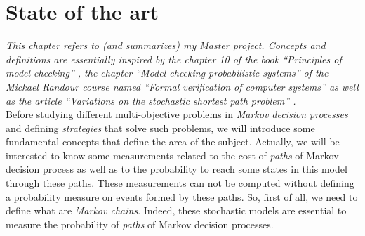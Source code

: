 \chapter{State of the art}
\textit{This chapter refers to (and summarizes) my Master project. Concepts and definitions are essentially inspired by the chapter 10 of the book ``Principles of model checking'' \cite{PMC}, the chapter ``Model checking probabilistic systems'' of the Mickael Randour course named ``Formal verification of computer systems'' \cite{MRV} as well as the article ``Variations on the stochastic shortest path problem'' \cite{DBLP:journals/corr/RandourRS14a}.} \\

Before studying different multi-objective problems in \textit{Markov decision
processes} and defining \textit{strategies} that solve such problems, we will introduce some fundamental concepts that define the area of the subject.
Actually, we will be interested to know some measurements related to the cost of \textit{paths} of Markov decision process as well as to the probability to reach some states in this model through these paths.
These measurements can not be computed without defining a probability measure on events formed by these paths.
So, first of all, we need to define what are \textit{Markov chains}. Indeed, these
stochastic models are essential to measure the probability of \textit{paths} of Markov decision processes.

